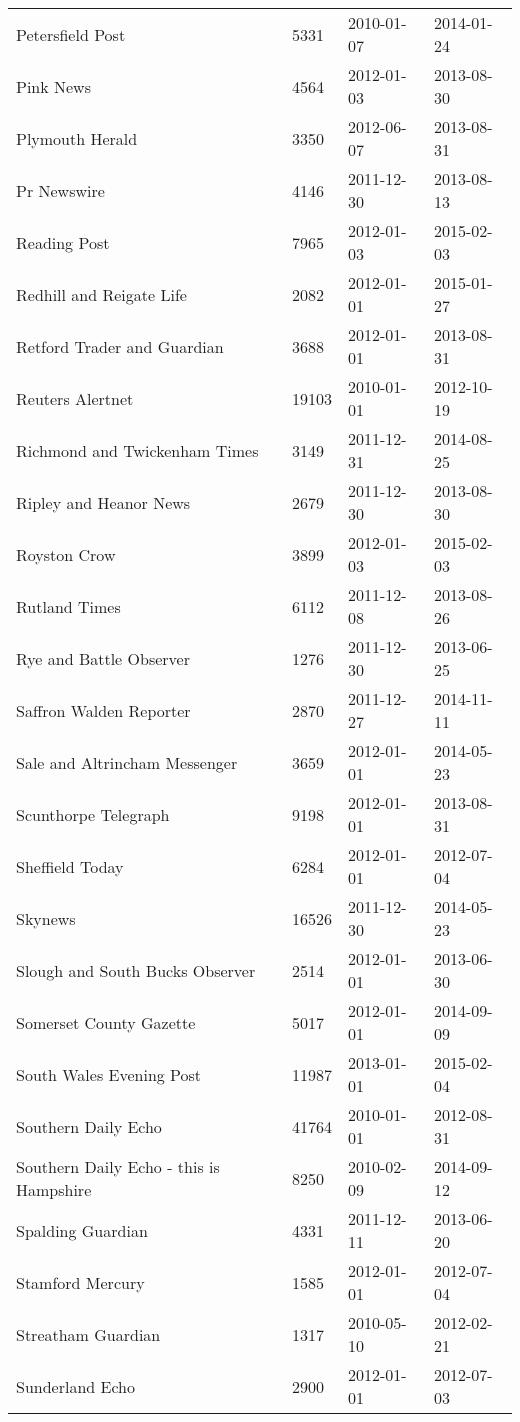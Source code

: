 \begin{longtable}{p{}p{}p{}p{}}
  Petersfield Post & 5331 & 2010-01-07 & 2014-01-24 \\ 
  Pink News & 4564 & 2012-01-03 & 2013-08-30 \\ 
  Plymouth Herald & 3350 & 2012-06-07 & 2013-08-31 \\ 
  Pr Newswire & 4146 & 2011-12-30 & 2013-08-13 \\ 
  Reading Post & 7965 & 2012-01-03 & 2015-02-03 \\ 
  Redhill and Reigate Life & 2082 & 2012-01-01 & 2015-01-27 \\ 
  Retford Trader and Guardian & 3688 & 2012-01-01 & 2013-08-31 \\ 
  Reuters Alertnet & 19103 & 2010-01-01 & 2012-10-19 \\ 
  Richmond and Twickenham Times & 3149 & 2011-12-31 & 2014-08-25 \\ 
  Ripley and Heanor News & 2679 & 2011-12-30 & 2013-08-30 \\ 
  Royston Crow & 3899 & 2012-01-03 & 2015-02-03 \\ 
  Rutland Times & 6112 & 2011-12-08 & 2013-08-26 \\ 
  Rye and Battle Observer & 1276 & 2011-12-30 & 2013-06-25 \\ 
  Saffron Walden Reporter & 2870 & 2011-12-27 & 2014-11-11 \\ 
  Sale and Altrincham Messenger & 3659 & 2012-01-01 & 2014-05-23 \\ 
  Scunthorpe Telegraph & 9198 & 2012-01-01 & 2013-08-31 \\ 
  Sheffield Today & 6284 & 2012-01-01 & 2012-07-04 \\ 
  Skynews & 16526 & 2011-12-30 & 2014-05-23 \\ 
  Slough and South Bucks Observer & 2514 & 2012-01-01 & 2013-06-30 \\ 
  Somerset County Gazette & 5017 & 2012-01-01 & 2014-09-09 \\ 
  South Wales Evening Post & 11987 & 2013-01-01 & 2015-02-04 \\ 
  Southern Daily Echo & 41764 & 2010-01-01 & 2012-08-31 \\ 
  Southern Daily Echo - this is Hampshire & 8250 & 2010-02-09 & 2014-09-12 \\ 
  Spalding Guardian & 4331 & 2011-12-11 & 2013-06-20 \\ 
  Stamford Mercury & 1585 & 2012-01-01 & 2012-07-04 \\ 
  Streatham Guardian & 1317 & 2010-05-10 & 2012-02-21 \\ 
  Sunderland Echo & 2900 & 2012-01-01 & 2012-07-03 \\ 

\end{longtable}
